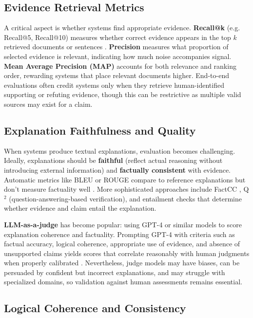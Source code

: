 \documentclass[12pt,a4paper]{article}
\begin{document}
\subsection{Evidence Retrieval Metrics}

A critical aspect is whether systems find appropriate evidence. \textbf{Recall@k} (e.g. Recall@5, Recall@10) measures whether correct evidence appears in the top $k$ retrieved documents or sentences \citep{thorne2018fever}. \textbf{Precision} measures what proportion of selected evidence is relevant, indicating how much noise accompanies signal. \textbf{Mean Average Precision (MAP)} accounts for both relevance and ranking order, rewarding systems that place relevant documents higher. End-to-end evaluations often credit systems only when they retrieve human-identified supporting or refuting evidence, though this can be restrictive as multiple valid sources may exist for a claim.

\subsection{Explanation Faithfulness and Quality}

When systems produce textual explanations, evaluation becomes challenging. Ideally, explanations should be \textbf{faithful} (reflect actual reasoning without introducing external information) and \textbf{factually consistent} with evidence. Automatic metrics like BLEU or ROUGE compare to reference explanations but don't measure factuality well \citep{raschka2025llmeval}. More sophisticated approaches include FactCC \citep{skywork2024hallucinations}, Q$^2$ (question-answering-based verification), and entailment checks that determine whether evidence and claim entail the explanation.

\textbf{LLM-as-a-judge} has become popular: using GPT-4 or similar models to score explanation coherence and factuality. Prompting GPT-4 with criteria such as factual accuracy, logical coherence, appropriate use of evidence, and absence of unsupported claims yields scores that correlate reasonably with human judgments when properly calibrated \citep{raschka2025llmeval, ruder2025llmeval}. Nevertheless, judge models may have biases, can be persuaded by confident but incorrect explanations, and may struggle with specialized domains, so validation against human assessments remains essential.

\subsection{Logical Coherence and Consistency}
\end{document}
